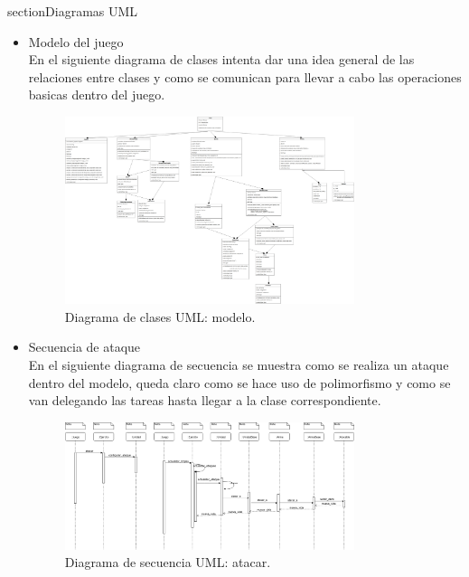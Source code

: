 \documentclass[titlepage,a4paper,12pt]{article}
\begin{document}
section{Diagramas UML}
\begin{itemize}

\item Modelo del juego\\

En el siguiente diagrama de clases intenta dar una idea general de las relaciones entre clases y como se comunican para llevar a cabo las operaciones basicas dentro del juego.\\

\begin{figure}[H]
	\centering
	\includegraphics[width=0.8\textwidth]{../imagenes/modelo_clases.png}
	\caption{\label{fig:seq_uml_agregar_terreno} Diagrama de clases UML: modelo.}
\end{figure}

\item Secuencia de ataque\\
En el siguiente diagrama de secuencia se muestra como se realiza un ataque dentro del modelo, queda claro como se hace uso de polimorfismo y como se van delegando las tareas hasta llegar a la clase correspondiente.\\
\begin{figure}[H]
	\centering
	\includegraphics[width=0.8\textwidth]{../imagenes/secuencia_ataque.png}
	\caption{\label{fig:seq_uml_agregar_terreno} Diagrama de secuencia UML: atacar.}
\end{figure}

\end{itemize}
\end{document}
